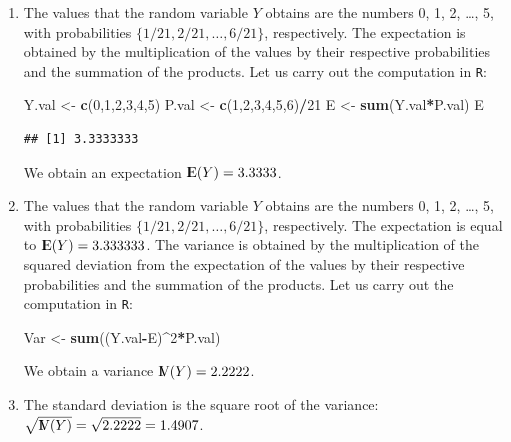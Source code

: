 \documentclass[]{krantz}
\makeatletter
\newenvironment{Shaded}{\begin{snugshade}}{\end{snugshade}}
\newcommand{\KeywordTok}[1]{\textcolor[rgb]{0.13,0.29,0.53}{\textbf{#1}}}
\newcommand{\DecValTok}[1]{\textcolor[rgb]{0.00,0.00,0.81}{#1}}
\newcommand{\StringTok}[1]{\textcolor[rgb]{0.31,0.60,0.02}{#1}}
\newcommand{\OperatorTok}[1]{\textcolor[rgb]{0.81,0.36,0.00}{\textbf{#1}}}
\newcommand{\NormalTok}[1]{#1}
\newcommand{\Expec}{{\rm I\kern-.3em E}}
\newcommand{\Var}{{\rm I\kern-.3em V}}
\newenvironment{kframe}{%
\medskip{}
\setlength{\fboxsep}{.8em}
 \def\at@end@of@kframe{}%
 \ifinner\ifhmode%
  \def\at@end@of@kframe{\end{minipage}}%
  \begin{minipage}{\columnwidth}%
 \fi\fi%
 \def\FrameCommand##1{\hskip\@totalleftmargin \hskip-\fboxsep
 \colorbox{shadecolor}{##1}\hskip-\fboxsep
     \hskip-\linewidth \hskip-\@totalleftmargin \hskip\columnwidth}%
 \MakeFramed {\advance\hsize-\width
   \@totalleftmargin\z@ \linewidth\hsize
   \@setminipage}}%
 {\par\unskip\endMakeFramed%
 \at@end@of@kframe}
\renewenvironment{Shaded}{\begin{kframe}}{\end{kframe}}
\theoremstyle{definition}
\theoremstyle{definition}
\theoremstyle{definition}
\theoremstyle{remark}
\makeatother
\begin{document}
\begin{enumerate}
\def\labelenumi{\arabic{enumi}.}
\setcounter{enumi}{5}
\item
  The values that the random variable \(Y\) obtains are the numbers 0,
  1, 2, \ldots{}, 5, with probabilities
  \(\{1/21, 2/21, \ldots, 6/21\}\), respectively. The expectation is
  obtained by the multiplication of the values by their respective
  probabilities and the summation of the products. Let us carry out the
  computation in \texttt{R}:

\begin{Shaded}
\begin{Highlighting}[]
\NormalTok{Y.val <-}\StringTok{ }\KeywordTok{c}\NormalTok{(}\DecValTok{0}\NormalTok{,}\DecValTok{1}\NormalTok{,}\DecValTok{2}\NormalTok{,}\DecValTok{3}\NormalTok{,}\DecValTok{4}\NormalTok{,}\DecValTok{5}\NormalTok{)}
\NormalTok{P.val <-}\StringTok{ }\KeywordTok{c}\NormalTok{(}\DecValTok{1}\NormalTok{,}\DecValTok{2}\NormalTok{,}\DecValTok{3}\NormalTok{,}\DecValTok{4}\NormalTok{,}\DecValTok{5}\NormalTok{,}\DecValTok{6}\NormalTok{)}\OperatorTok{/}\DecValTok{21}
\NormalTok{E <-}\StringTok{ }\KeywordTok{sum}\NormalTok{(Y.val}\OperatorTok{*}\NormalTok{P.val)}
\NormalTok{E}
\end{Highlighting}
\end{Shaded}

\begin{verbatim}
## [1] 3.3333333
\end{verbatim}

  We obtain an expectation \(\Expec(Y) = 3.3333\).
\item
  The values that the random variable \(Y\) obtains are the numbers 0,
  1, 2, \ldots{}, 5, with probabilities
  \(\{1/21, 2/21, \ldots, 6/21\}\), respectively. The expectation is
  equal to \(\Expec(Y) = 3.333333\). The variance is obtained by the
  multiplication of the squared deviation from the expectation of the
  values by their respective probabilities and the summation of the
  products. Let us carry out the computation in \texttt{R}:

\begin{Shaded}
\begin{Highlighting}[]
\NormalTok{Var <-}\StringTok{ }\KeywordTok{sum}\NormalTok{((Y.val}\OperatorTok{-}\NormalTok{E)}\OperatorTok{^}\DecValTok{2}\OperatorTok{*}\NormalTok{P.val)}
\end{Highlighting}
\end{Shaded}

  We obtain a variance \(\Var(Y) = 2.2222\).
\item
  The standard deviation is the square root of the variance:
  \(\sqrt{\Var(Y)} = \sqrt{2.2222} = 1.4907\).
\end{enumerate}
\end{document}
